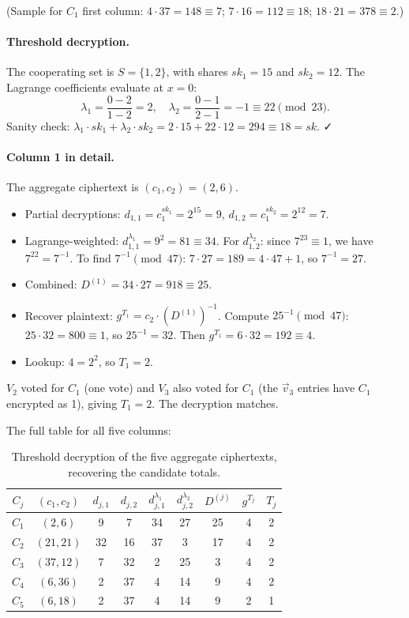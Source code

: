 \documentclass[12pt,a4paper,oneside]{report}
\begin{document}
(Sample for $C_1$ first column: $4 \cdot 37 = 148 \equiv 7$; $7 \cdot 16 = 112 \equiv 18$; 
$18 \cdot 21 = 378 \equiv 2$.)

\paragraph{Threshold decryption.} 
The cooperating set is $S = \{1, 2\}$, with shares $sk_1 = 15$ and 
$sk_2 = 12$. The Lagrange coefficients evaluate at $x = 0$:
\[
    \lambda_1 = \frac{0 - 2}{1 - 2} = 2, \quad
    \lambda_2 = \frac{0 - 1}{2 - 1} = -1 \equiv 22 \pmod{23}.
\]
Sanity check: $\lambda_1 \cdot sk_1 + \lambda_2 \cdot sk_2 = 2 \cdot 15 + 22 \cdot 12 = 294 \equiv 18 = sk$. ✓

\paragraph{Column 1 in detail.} The aggregate ciphertext is $(c_1, c_2) = (2, 6)$.
\begin{itemize}
    \item Partial decryptions: $d_{1, 1} = c_1^{sk_1} = 2^{15} = 9$, 
    $d_{1, 2} = c_1^{sk_2} = 2^{12} = 7$.
    \item Lagrange-weighted: $d_{1, 1}^{\lambda_1} = 9^2 = 81 \equiv 34$. 
    For $d_{1, 2}^{\lambda_2}$: since $7^{23} \equiv 1$, we have 
    $7^{22} = 7^{-1}$. To find $7^{-1} \pmod{47}$: $7 \cdot 27 = 189 = 4 \cdot 47 + 1$, 
    so $7^{-1} = 27$.
    \item Combined: $D^{(1)} = 34 \cdot 27 = 918 \equiv 25$.
    \item Recover plaintext: $g^{T_1} = c_2 \cdot (D^{(1)})^{-1}$. 
    Compute $25^{-1} \pmod{47}$: $25 \cdot 32 = 800 \equiv 1$, so $25^{-1} = 32$. 
    Then $g^{T_1} = 6 \cdot 32 = 192 \equiv 4$.
    \item Lookup: $4 = 2^2$, so $T_1 = 2$.
\end{itemize}
$V_2$ voted for $C_1$ (one vote) and $V_3$ also voted for $C_1$ (the 
$\vec{v}_3$ entries have $C_1$ encrypted as 1), giving $T_1 = 2$. 
The decryption matches.

The full table for all five columns:

\begin{table}[H]
\centering
\caption{Threshold decryption of the five aggregate ciphertexts, recovering 
the candidate totals.}
\label{tab:byhand-decryption}
\small
\begin{tabular}{ccccccccc}
\toprule
$C_j$ & $(c_1, c_2)$ & $d_{j, 1}$ & $d_{j, 2}$ & $d_{j, 1}^{\lambda_1}$ & 
$d_{j, 2}^{\lambda_2}$ & $D^{(j)}$ & $g^{T_j}$ & $T_j$ \\
\midrule
$C_1$ & $(2, 6)$    & 9  & 7  & 34 & 27 & 25 & 4 & 2 \\
$C_2$ & $(21, 21)$  & 32 & 16 & 37 & 3  & 17 & 4 & 2 \\
$C_3$ & $(37, 12)$  & 7  & 32 & 2  & 25 & 3  & 4 & 2 \\
$C_4$ & $(6, 36)$   & 2  & 37 & 4  & 14 & 9  & 4 & 2 \\
$C_5$ & $(6, 18)$   & 2  & 37 & 4  & 14 & 9  & 2 & 1 \\
\bottomrule
\end{tabular}
\end{table}
\end{document}
